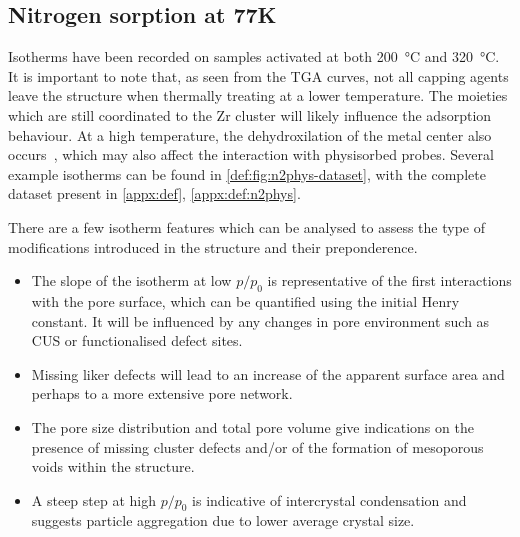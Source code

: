 
\subsection{Nitrogen sorption at 77K}

Isotherms have been recorded on samples activated at both
\SI{200}{\degreeCelsius} and \SI{320}{\degreeCelsius}.
It is important to note that, as seen from the TGA curves,
not all capping agents leave the structure when thermally treating
at a lower temperature. The moieties which are still coordinated
to the Zr cluster will likely influence the adsorption
behaviour. At a high temperature, the dehydroxilation of the 
metal center also occurs~\cite{valenzanoDisclosingComplexStructure2011},
which may also affect the interaction with physisorbed probes. 
Several example isotherms can be found in
\autoref{def:fig:n2phys-dataset}, with the complete dataset
present in \autoref{appx:def}, \autoref{appx:def:n2phys}.

There are a few isotherm features which can be analysed to
assess the type of modifications introduced in the structure
and their preponderence.

\begin{itemize}
	\item The slope of the isotherm at low \(p/p_0\) is representative
	      of the first interactions with the pore surface, which can be
	      quantified using the initial Henry constant. It will be influenced
		  by any changes in pore environment such as CUS or functionalised
		  defect sites.
	\item Missing liker defects will lead to an increase of the
	      apparent surface area and perhaps to a more extensive
	      pore network.
	\item The pore size distribution and total pore volume give
	      indications on the presence of missing cluster defects and/or
	      of the formation of mesoporous voids within the structure.
	\item A steep step at high \(p/p_0\) is indicative of intercrystal
	      condensation and suggests particle aggregation due to lower average
	      crystal size.
\end{itemize}

